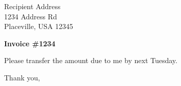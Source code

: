 \documentclass[11pt]{letter}
\begin{document}
\begin{letter}{ Recipient Address \\ 1234 Address Rd \\ Placeville, USA 12345 }

	\opening{\textbf{\Large Invoice \#1234}}
	\begin{invoice}
	\end{invoice}

	Please transfer the amount due to me by next Tuesday.

\closing{Thank you,}

\end{letter}
\end{document}
